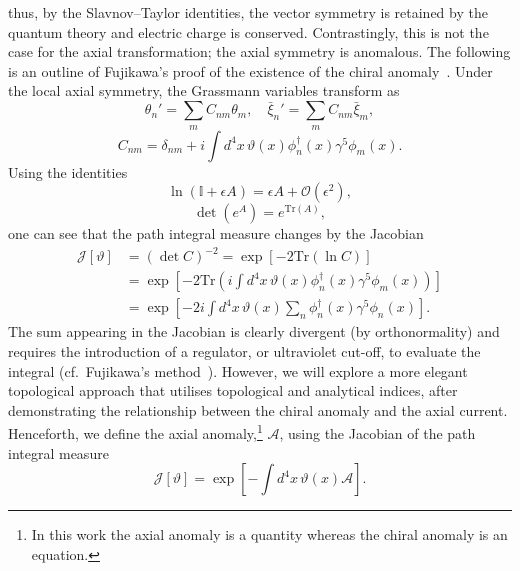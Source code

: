 \documentclass[11pt, a4paper]{article}
\begin{document}
thus, by the Slavnov–Taylor identities,
the vector symmetry is retained by the quantum theory and electric charge is conserved.
Contrastingly, this is not the case for the axial transformation;
the axial symmetry is anomalous. The following is an
outline of Fujikawa's proof of the existence of the chiral anomaly~\cite{Fujikawa,Fujikawa2}.
Under the local axial symmetry, the Grassmann variables transform as
\begin{equation}
  \theta_n' = \sum_m{C_{nm} \theta_m}, \quad \bar{\xi}_n' = \sum_m{C_{nm} \bar{\xi}_m},
\end{equation}
\begin{equation}
  C_{nm} = \delta_{nm} +i\int{d^4x\, \vartheta(x)\phi_{n}^{\dagger}(x)\gamma^5\phi_m(x)}.
\end{equation}
Using the identities
\begin{equation}
  \ln{(\mathbb{I} + \epsilon A)} = \epsilon A + \mathcal{O}(\epsilon^2),
\end{equation}
\begin{equation}
  \det\left( e^{A}\right) = e^{\mathrm{Tr}(A)},
\end{equation}
one can see that the path integral measure changes by the Jacobian
\begin{equation}\label{eq:10}
  \begin{split}
    \mathcal{J}[\vartheta] & = {(\det{C})}^{-2} = \exp\left[-2 \mathrm{Tr}(\ln{C}) \right] \\
   & = \exp{\left[-2\mathrm{Tr}\left(i
  \int{d^4x\,  \vartheta(x)\phi_{n}^{\dagger}(x)\gamma^5\phi_m(x)} \right) \right]} \\
   & = \exp{\left[ -2i
  \int{d^4x\,\vartheta(x) \sum_n{\phi_{n}^{\dagger}(x)\gamma^5\phi_n(x)}} \right]}.
  \end{split}
\end{equation}
The sum appearing in the Jacobian is clearly divergent (by orthonormality)
and requires the introduction of a regulator, or ultraviolet cut-off, to evaluate
the integral (cf.~Fujikawa's method~\cite{Fujikawa}).
However, we will explore a more elegant topological approach that utilises
topological and analytical indices,
after demonstrating the relationship between the chiral anomaly
and the axial current. Henceforth, we define the axial anomaly,\footnote{In
this work the axial anomaly is a quantity whereas the chiral anomaly is an equation.}
$\mathcal{A}$, using the Jacobian of the path integral measure
\begin{equation}
  \mathcal{J}[\vartheta] = \exp{\left[ - \int{d^4x\,\vartheta(x) \mathcal{A} } \right]}.
\end{equation}
\end{document}
